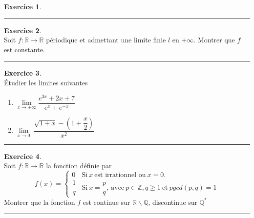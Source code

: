 \documentclass[a4paper,10pt]{article}
\theoremstyle{definition}
\theoremstyle{definition}
\newtheorem{exo}{Exercice}
\newcommand{\R}{\mathbb{R}}
\newcommand{\Q}{\mathbb{Q}}
\newcommand{\Z}{\mathbb{Z}}
\begin{document}
\begin{minipage}{1\linewidth}
\begin{minipage}[t]{0.48\linewidth}
\begin{exo}
\centering
\rule{1\linewidth}{0.6pt}
\end{exo}
\begin{exo}\quad\\
Soit $f: \R\rightarrow\R$ périodique et admettant une limite finie $l$ en $+\infty$. Montrer que $f$ est constante.

\centering
\rule{1\linewidth}{0.6pt}
\end{exo}

\begin{exo}\quad\\
Étudier les limites suivantes
\begin{multicols}{2}
\begin{enumerate}
\item $\lim\limits_{x\rightarrow+\infty} \dfrac{e^{3x}+2x+7}{e^x + e^{-x}}$
\item $\lim\limits_{x\rightarrow 0}~\dfrac{\sqrt{1+x} - \left(1+ \dfrac{x}{2}\right) }{x^2 } $

\end{enumerate}
\end{multicols}
\centering\rule{1\linewidth}{0.6pt}
\end{exo}
\begin{exo}\quad\\
Soit $f: \R\rightarrow\R$ la fonction définie par 
$$f(x) =\left\{\begin{array}{cl}
0  & \text{Si} \ x \   \text{est irrationnel ou} \  x=0. \\
\dfrac{1}{q} & \text{Si} \  x=\dfrac{p}{q},\ \text{avec} \  p\in\Z, q\geq 1 \ \text{et} \ pgcd(p,q) =1  
\end{array}\right.$$
Montrer que la fonction $f$ est continue sur $\R \backslash \Q$, discontinue sur $\Q^*$ \\

\centering
\rule{1\linewidth}{0.6pt}
\end{exo}


\end{minipage}
\end{minipage}
\end{document}
